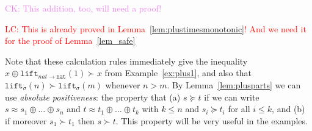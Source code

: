 \documentclass[a4paper,UKenglish,cleveref,autoref,numberwithinsect]{lipics-v2019}
\theoremstyle{definition}
\newcommand{\arrtype}{\rightarrow}
\newcommand{\nat}{\mathtt{nat}}
\newcommand{\lift}{\mathtt{lift}}
\newcommand{\CK}[1]{\textcolor{violet}{CK: #1}}
\newcommand{\LC}[1]{\textcolor{red}{LC: #1}}
\begin{document}
\CK{This addition, too, will need a proof!}

\LC{This is already proved in Lemma~\ref{lem:plustimesmonotonic}! And
  we need it for the proof of Lemma~\ref{lem_safe}}

Note that these calculation rules immediately give the
inequality $x \oplus \lift_{nat \arrtype \nat}(1) \succ x$ from
Example~\ref{ex:plus1}, and also that $\lift_\sigma(n) \succ
\lift_\sigma(m)$ whenever $n > m$.  By Lemma~\ref{lem:plusparts} we
can use \emph{absolute positiveness}: the property that
(a) $s \succeq t$ if we can write $s \approx s_1 \oplus \dots \oplus
s_n$ and $t \approx t_1 \oplus \dots \oplus t_k$ with $k \leq n$ and
$s_i \succeq t_i$ for all $i \leq k$, and (b) if moreover $s_1 \succ
t_1$ then $s \succ t$.  This property will be very useful in the
examples.
\end{document}
